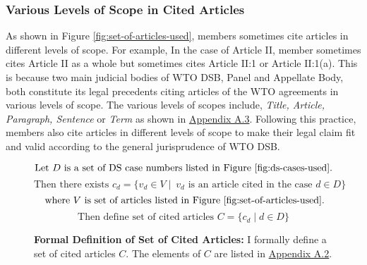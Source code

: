 \subsubsection{Various Levels of Scope in Cited Articles}

As shown in Figure \ref{fig:set-of-articles-used},
members sometimes
cite articles in different levels of scope. For example,
In the case of Article II, member sometimes cites
Article II as a whole but sometimes cites
Article II:1 or Article II:1(a).
This is because two main judicial bodies of WTO DSB, Panel and Appellate Body,
both constitute its legal precedents citing articles of the WTO agreements in
various levels of scope.
The various levels of scopes include, \textit{Title, Article, Paragraph, Sentence} or \textit{Term} as shown in  \hyperref[xltabular:level-of-scopes]{Appendix A.3}.
Following this practice, members also cite articles in different levels of scope to
make their legal claim fit and valid according to the general jurisprudence of WTO DSB.\\ %

\begin{figure}[t]
   \[\text{Let } D \text{ is a set of DS case numbers listed in Figure \ref{fig:ds-cases-used}.} \] %
   \[\text{Then there exists } c_d = \{v_d \in V \mid\ v_d \text{ is an article cited in the case } d \in D\} \]
   \[\text{ where } V \text{ is set of articles listed in Figure \ref{fig:set-of-articles-used}}.\]
   \[\text{Then define set of cited articles } C = \{c_d \mid d \in D\}\]
   \caption{\textbf{Formal Definition of Set of Cited Articles: }I formally define a set of cited articles $C$. The elements of $C$ are listed in \hyperref[sub:cited-articles-table]{Appendix A.2}.}
   \label{fig:def:set-of-cited-articles}
\end{figure}



